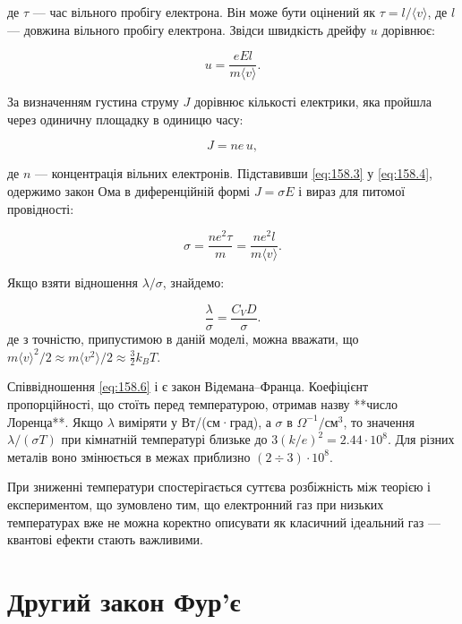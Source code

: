 де $\tau$ — час вільного пробігу електрона. Він може бути оцінений як
$\tau = l / \langle v \rangle$, де $l$ — довжина вільного пробігу електрона.
Звідси швидкість дрейфу $u$ дорівнює:

\begin{equation}
	u = \frac{eEl}{m\langle v \rangle}.
	\label{eq:158.3}
\end{equation}

За визначенням густина струму $J$ дорівнює кількості електрики, яка пройшла
через одиничну площадку в одиницю часу:

\begin{equation}
	J = ne\,u ,
	\label{eq:158.4}
\end{equation}

де $n$ — концентрація вільних електронів. Підставивши \eqref{eq:158.3}
у \eqref{eq:158.4}, одержимо закон Ома в диференційній формі
$J = \sigma E$ і вираз для питомої провідності:

\begin{equation}
	\sigma = \frac{n e^{2} \tau}{m}
	= \frac{n e^{2} l}{m \langle v \rangle}.
	\label{eq:158.5}
\end{equation}

Якщо взяти відношення $\lambda / \sigma$, знайдемо:

\begin{equation}
	\frac{\lambda}{\sigma} = \frac{C_V D}{\sigma}.
	\label{eq:158.6}
\end{equation}
%
де з точністю, припустимою в даній моделі, можна вважати, що
$m\langle v \rangle^{2}/2 \approx m\langle v^{2} \rangle/2 \approx \tfrac{3}{2}k_B T$.

Співвідношення \eqref{eq:158.6} і є закон Відемана–Франца. Коефіцієнт
пропорційності, що стоїть перед температурою, отримав назву
**число Лоренца**. Якщо $\lambda$ виміряти у
Вт/(см·град), а $\sigma$ в $\Omega^{-1}/\text{см}^3$, то значення
$\lambda / (\sigma T)$ при кімнатній температурі близьке до
$3(k/e)^2 = 2.44 \cdot 10^{8}$. Для різних металів воно змінюється
в межах приблизно $(2 \div 3)\cdot10^{8}$.

При зниженні температури спостерігається суттєва розбіжність між
теорією і експериментом, що зумовлено тим, що електронний газ при
низьких температурах вже не можна коректно описувати як класичний
ідеальний газ --- квантові ефекти стають важливими.

\section{Другий закон Фур’є}

